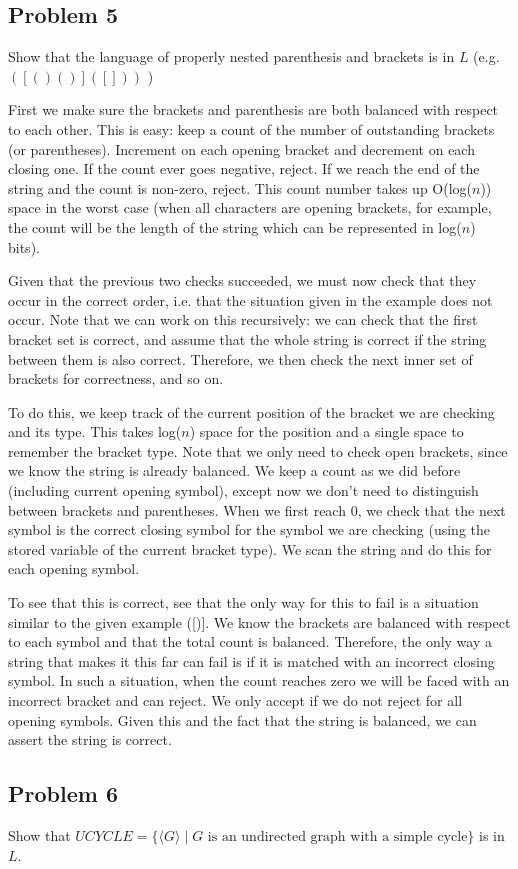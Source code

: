 \documentclass[english]{article}
\begin{document}
\subsection*{Problem 5}
Show that the language of properly nested parenthesis and brackets is in $L$ (e.g. $([()()]([]))$ )

First we make sure the brackets and parenthesis are both balanced with respect to each other.
This is easy: keep a count of the number of outstanding brackets (or parentheses). Increment on each
opening bracket and decrement on each closing one. If the count ever goes negative, reject. If we
reach the end of the string and the count is non-zero, reject. This count number takes up O(log($n$))
space in the worst case (when all characters are opening brackets, for example, the count will be
the length of the string which can be represented in log($n$) bits).

Given that the previous two checks succeeded, we must now check that they occur in the correct order,
i.e. that the situation given in the example does not occur. Note that we can work on this recursively:
we can check that the first bracket set is correct, and assume that the whole string is correct if the
string between them is also correct. Therefore, we then check the next inner set of brackets for
correctness, and so on.

To do this, we keep track of the current position of the bracket we are checking and its type.
This takes log($n$) space for the position and a single space to remember the bracket type.
Note that we only need to check open brackets, since we know the string is already balanced.
We keep a count as we did before (including current opening symbol), except now we don't need to
distinguish between brackets and parentheses. When we first reach 0, we check that the next symbol
is the correct closing symbol for the symbol we are checking (using the stored variable of the
current bracket type). We scan the string and do this for each opening symbol.

To see that this is correct, see that the only way for this to fail is a situation similar to the
given example ([)]. We know the brackets are balanced with respect to each symbol and that the total
count is balanced. Therefore, the only way a string that makes it this far can fail is if it is
matched with an incorrect closing symbol. In such a situation, when the count reaches zero we will
be faced with an incorrect bracket and can reject. We only accept if we do not reject for all
opening symbols. Given this and the fact that the string is balanced, we can assert the string is
correct.

\subsection*{Problem 6}
Show that $UCYCLE = \{ \langle G \rangle \mid G \textrm{ is an undirected graph with a simple cycle} \}$
is in $L$.
\end{document}
